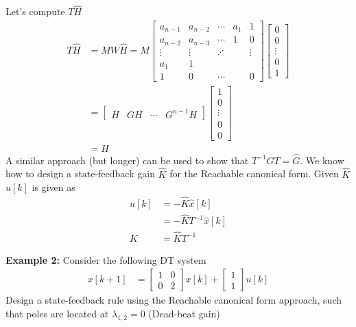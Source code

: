\documentclass[twoside]{article}
\begin{document}
%
Let's compute $T \hat{H}$
%
\begin{align*}
T \hat{H} &= M W \hat{H} = M 
\left[ \begin{array}{ccccc} a_{n-1} & a_{n-2} & \cdots & a_1 & 1
               \\ 
a_{n-2} & a_{n-3} & \cdots & 1 & 0
\\ \vdots & \vdots & \iddots & & \vdots
\\ a_1 & 1 &  & & 
    \\ 1 & 0 & \cdots &  & 0 \end{array} \right] 
\left[ \begin{array}{c} 0\\ 0 \\ \vdots \\ 0
    \\ 1 \end{array} \right]
\\
&= \left[ \begin{array}{c|c|c|c} H & G H & \cdots & G^{n-1}
                                                    H\end{array}
                                                    \right]
\left[ \begin{array}{c} 1\\ 0 \\ \vdots \\ 0
    \\ 0 \end{array} \right]
\\
&= H
\end{align*}
%
A similar approach (but longer) can be used to show 
that $T^{-1} G T = \hat{G}$. We know how to design a
state-feedback gain $\hat{K}$ for the Reachable
canonical form. Given $\hat{K}$ 
$u[k]$ is given as
%
\begin{align*}
  u[k] &= -\hat{K} \hat{x}[k]
\\ 
&= - \hat{K} T^{-1} \hat{x}[k]
\\
K &= \hat{K} T^{-1}
\end{align*}

\textbf{Example 2:} Consider the following DT system
%
\begin{align*}
 x[k+1] &= \left[ \begin{array}{cc} 1 & 0 \\ 0 & 2 \end{array} \right] x[k]
    + \left[ \begin{array}{c} 1 \\ 1 \end{array} \right] u[k]
\end{align*}
% 
Design a state-feedback rule using the Reachable canonical form
approach, such that poles are located at 
$\lambda_{1,2} = 0$ (Dead-beat gain)
\end{document}
